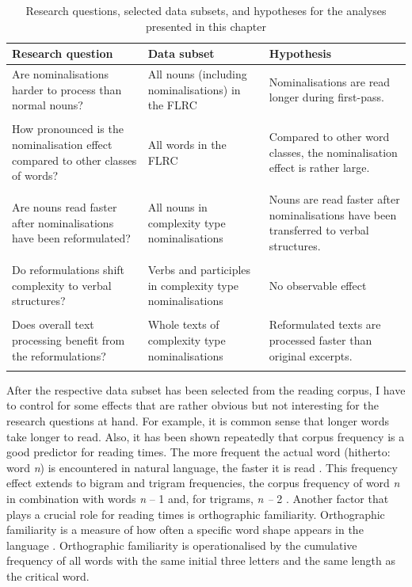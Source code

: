 \documentclass[output=paper]{langsci/langscibook}
\begin{document}
\begin{table}
\begin{tabularx}{\textwidth}{XXX}
\lsptoprule
 Research question & Data subset & Hypothesis\\
\midrule 
 Are nominalisations harder to process than normal nouns? & All nouns (including nominalisations) in the FLRC & Nominalisations are read longer during first-pass.\\ \\
 How pronounced is the nominalisation effect compared to other classes of words? & All words in the FLRC & Compared to other word classes, the nominalisation effect is rather large.\\ \\
 Are nouns read faster after nominalisations have been reformulated? & All nouns in complexity type nominalisations & Nouns are read faster after nominalisations have been transferred to verbal structures.\\ \\
 Do reformulations shift complexity to verbal structures? & Verbs and participles in complexity type nominalisations & No observable effect\\ \\
 Does overall text processing benefit from the reformulations? & Whole texts of complexity type nominalisations & Reformulated texts are processed faster than original excerpts.\\
\lspbottomrule
\end{tabularx}
\caption{Research questions, selected data subsets, and hypotheses for the analyses presented in this chapter}
\label{wolfer:tab:2}
\end{table}
After the respective data subset has been selected from the reading corpus, I have to control for some effects that are rather obvious but not interesting for the research questions at hand. For example, it is common sense that longer words take longer to read. Also, it has been shown repeatedly that corpus frequency is a good predictor for reading times. The more frequent the actual word (hitherto: word \textit{n}) is encountered in natural language, the faster it is read \citep[cf. ][]{Kliegl2004}. This frequency effect extends to bigram and trigram frequencies, the corpus frequency of word \textit{n }in combination with words \textit{n }-- 1 and, for trigrams, \textit{n -- }2 \citep[cf. ][]{Boston2008}. Another factor that plays a crucial role for reading times is orthographic familiarity. Orthographic familiarity is a measure of how often a specific word shape appears in the language \citep[cf. ][]{White2008}. Orthographic familiarity is operationalised by the cumulative frequency of all words with the same initial three letters and the same length as the critical word. 
\end{document}
